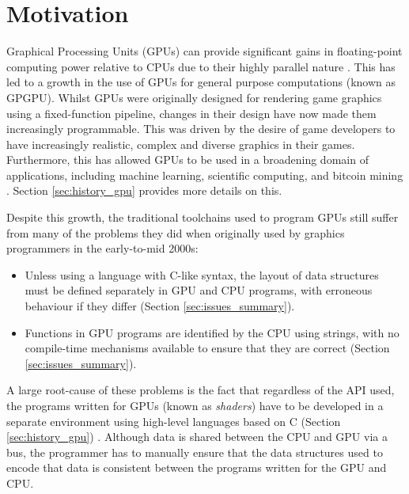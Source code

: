 \documentclass[a4paper,12pt,twoside,openright]{report}
\begin{document}
\section{Motivation}

\label{sec:motivation}

Graphical Processing Units (GPUs) can provide significant gains in
floating-point computing power relative to CPUs due to their highly parallel
nature \cite{CPUGPUOverTime}. This has led to a growth in the use of GPUs for
general purpose computations (known as GPGPU). Whilst GPUs were originally
designed for rendering game graphics using a fixed-function pipeline, changes
in their design have now made them increasingly programmable. This was driven
by the desire of game developers to have increasingly realistic, complex and
diverse graphics in their games. Furthermore, this has allowed GPUs to be used
in a broadening domain of applications, including machine learning, scientific
computing, and bitcoin mining \cite{GPUCrypto} \cite{GPUScientificComputing}
\cite{GPUAI}. Section \ref{sec:history_gpu} provides more details on this.

Despite this growth, the traditional toolchains used to program GPUs still
suffer from many of the problems they did when originally used by graphics
programmers in the early-to-mid 2000s:

\begin{itemize}

    \item Unless using a language with C-like syntax, the layout of data
    structures must be defined separately in GPU and CPU programs, with
    erroneous behaviour if they differ (Section \ref{sec:issues_summary}).

    \item Functions in GPU programs are identified by the CPU using strings,
    with no compile-time mechanisms available to ensure that they are correct
    (Section \ref{sec:issues_summary}).

\end{itemize}

A large root-cause of these problems is the fact that regardless of the API
used, the programs written for GPUs (known as \textit{shaders}) have to be
developed in a separate environment using high-level languages based on C
(Section \ref{sec:history_gpu}) \cite{TripThroughGraphicsPipeline1}. Although
data is shared between the CPU and GPU via a bus, the programmer has to
manually ensure that the data structures used to encode that data is consistent
between the programs written for the GPU and CPU.
\end{document}
